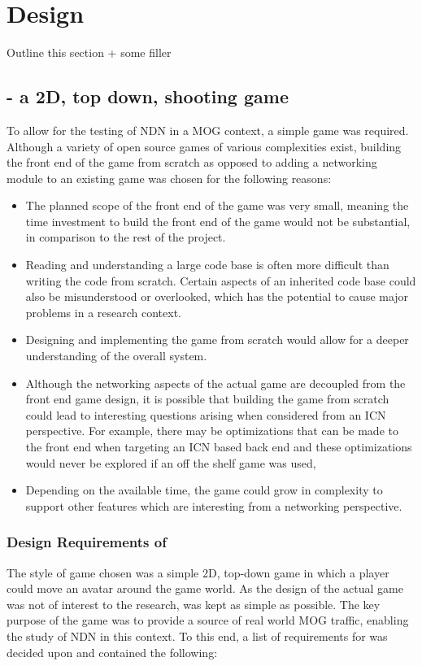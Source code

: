 \chapter{Design}
Outline this section + some filler


\section{\game{} - a 2D, top down, shooting game}
To allow for the testing of NDN in a MOG context, a simple game was required. Although a variety of open source games of various complexities exist, building the front end of the game from scratch as opposed to adding a networking module to an existing game was chosen for the following reasons:

\begin{itemize}
    \item The planned scope of the front end of the game was very small, meaning the time investment to build the front end of the game would not be substantial, in comparison to the rest of the project.
    \item Reading and understanding a large code base is often more difficult than writing the code from scratch. Certain aspects of an inherited code base could also be misunderstood or overlooked, which has the potential to cause major problems in a research context.
    \item Designing and implementing the game from scratch would allow for a deeper understanding of the overall system.
    \item Although the networking aspects of the actual game are decoupled from the front end game design, it is possible that building the game from scratch could lead to interesting questions arising when considered from an ICN perspective. For example, there may be optimizations that can be made to the front end when targeting an ICN based back end and these optimizations would never be explored if an off the shelf game was used,
    \item Depending on the available time, the game could grow in complexity to support other features which are interesting from a networking perspective.
\end{itemize}

\subsection{Design Requirements of \game{}}
The style of game chosen was a simple 2D, top-down game in which a player could move an avatar around the game world. As the design of the actual game was not of interest to the research, \game{} was kept as simple as possible. The key purpose of the game was to provide a source of real world MOG traffic, enabling the study of NDN in this context. To this end, a list of requirements for \game{} was decided upon and contained the following:

